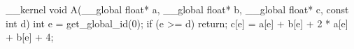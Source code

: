 __kernel void A(__global float* a,
                __global float* b,
                __global float* c,
                const int d) {
  int e = get_global_id(0);
  if (e >= d) {
    return;
  }
  c[e] = a[e] + b[e] + 2 * a[e] + b[e] + 4;
}
